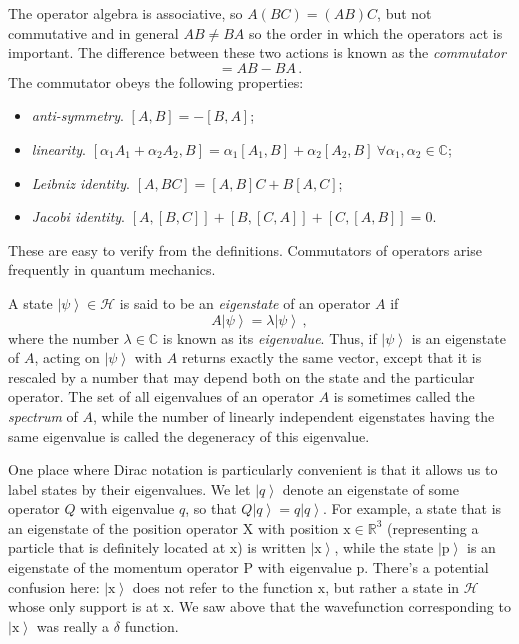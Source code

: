 \documentclass{article}
\theoremstyle{plain}\theoremheaderfont{\normalfont\itshape}\theorembodyfont{\rmfamily}\theoremseparator{.}\newtheorem*{rem}{Remark}\newtheorem*{ex}{Example}\newtheorem*{proof}{Proof}\newtheorem*{altp}{Alternative proof}
\theoremstyle{plain}\theoremheaderfont{\normalfont\bfseries}\theorembodyfont{\rmfamily}\theoremseparator{.}\newtheorem{thm}{Theorem}[section]\newtheorem{lem}[thm]{Lemma}\newtheorem{prop}[thm]{Proposition}\newtheorem*{cor}{Corollary}\newtheorem{defn}[thm]{Definition}\newtheorem{clm}[thm]{Claim}\newtheorem{clminproof}{Claim}
\theoremstyle{break}\theoremheaderfont{\normalfont\itshape}\theorembodyfont{\rmfamily}\theoremseparator{.\medskip}\newtheorem*{proofskip}{Proof}\newtheorem*{exs}{Examples}\newtheorem*{rems}{Remarks}
\theoremstyle{break}\theoremheaderfont{\normalfont\bfseries}\theorembodyfont{\rmfamily}\theoremseparator{.\medskip}\newtheorem{lemskip}[thm]{Lemma}\newtheorem{defnskip}[thm]{Definition}\newtheorem{propskip}[thm]{Proposition}\newtheorem{thmskip}[thm]{Theorem}
\numberwithin{equation}{section}
\newcommand{\ket}[1]{\left| #1 \right\rangle}
\newcommand{\vb}[1]{\bm{\mathrm{#1}}}
\newcommand{\hb}{\mathcal{H}}
\newcommand{\RR}{\mathbb{R}}
\newcommand{\CC}{\mathbb{C}}
\begin{document}
    The operator algebra is associative, so \(A(BC)=(AB)C\), but not commutative and in general \(AB\ne BA\) so the order in which the operators act is important. The difference between these two actions is known as the \textit{commutator}
    \begin{equation}
        [A,B]=AB-BA\,.
    \end{equation}
    The commutator obeys the following properties:
    \begin{itemize}[topsep=0pt]
        \item \textit{anti-symmetry}. \([A,B]=-[B,A]\);
        \item \textit{linearity}. \([\alpha_1A_1+\alpha_2A_2,B]=\alpha_1[A_1,B]+\alpha_2[A_2,B]\ \forall\alpha_1,\alpha_2\in\CC\);
        \item \textit{Leibniz identity}. \([A,BC]=[A,B]C+B[A,C]\);
        \item \textit{Jacobi identity}. \([A,[B,C]]+[B,[C,A]]+[C,[A,B]]=0\).
    \end{itemize}
    These are easy to verify from the definitions. Commutators of operators arise frequently in quantum mechanics.

    A state \(\ket{\psi}\in\hb\) is said to be an \textit{eigenstate} of an operator \(A\) if
    \begin{equation}
        A\ket{\psi}=\lambda\ket{\psi}\,,
    \end{equation}
    where the number \(\lambda\in\CC\) is known as its \textit{eigenvalue}. Thus, if \(\ket{\psi}\) is an eigenstate of \(A\), acting on \(\ket{\psi}\) with \(A\) returns exactly the same vector, except that it is rescaled by a number that may depend both on the state and the particular operator. The set of all eigenvalues of an operator \(A\) is sometimes called the \textit{spectrum} of \(A\), while the number of linearly independent eigenstates having the same eigenvalue is called the degeneracy of this eigenvalue.

    One place where Dirac notation is particularly convenient is that it allows us to label states by their eigenvalues. We let \(\ket{q}\) denote an eigenstate of some operator \(Q\) with eigenvalue \(q\), so that \(Q\ket{q}=q\ket{q}\). For example, a state that is an eigenstate of the position operator \(\vb{X}\) with position \(\vb{x}\in\RR^3\) (representing a particle that is definitely located at \(\vb{x}\)) is written \(\ket{\vb{x}}\), while the state \(\ket{\vb{p}}\) is an eigenstate of the momentum operator \(\vb{P}\) with eigenvalue \(\vb{p}\). There's a potential confusion here: \(\ket{\vb{x}}\) does not refer to the function \(\vb{x}\), but rather a state in \(\hb\) whose only support is at \(\vb{x}\). We saw above that the wavefunction corresponding to \(\ket{\vb{x}}\) was really a \(\delta\) function.
\end{document}
